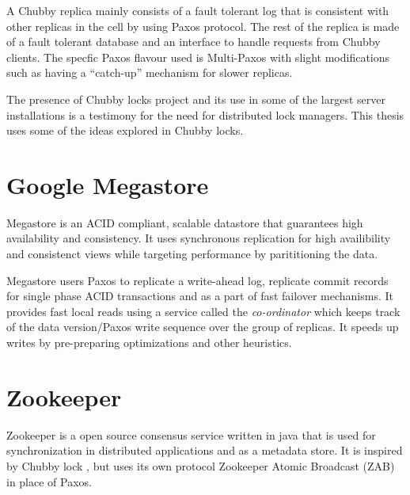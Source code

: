 A Chubby replica mainly consists of a fault tolerant log that is consistent
with other replicas in the cell by using Paxos protocol. The rest of the
replica is made of a fault tolerant database and an interface to handle
requests from Chubby clients. The specfic Paxos flavour used is Multi-Paxos
with slight modifications such as having a ``catch-up'' mechanism for
slower replicas.

The presence of Chubby locks project and its use in some of the largest 
server installations is a testimony for the need for distributed lock
managers. This thesis uses some of the ideas explored in Chubby locks.

\section{Google Megastore}

Megastore \citep{BakerBCFKLLLLY11} is an ACID%
compliant, scalable datastore that guarantees high availability and
consistency. It uses synchronous replication for high availibility and
consistenct views while targeting performance by parititioning the data.

Megastore users Paxos to replicate a write-ahead log, replicate commit
records for single phase ACID transactions and as a part of fast failover
mechanisms. It provides fast local reads using a service called the
\emph{co-ordinator} which keeps track of the data version/Paxos write
sequence over the group of replicas. It speeds up writes by pre-preparing
optimizations and other heuristics.

\section{Zookeeper}
\label{section:zookeeper}

Zookeeper \citep{Hunt:2010:ZWC:1855840.1855851, zookeeper} is a open source 
consensus service written in java that is used for synchronization in 
distributed applications and as a metadata store. It is inspired by Chubby lock 
, but uses its own protocol Zookeeper Atomic Broadcast 
(ZAB) in place of Paxos.

